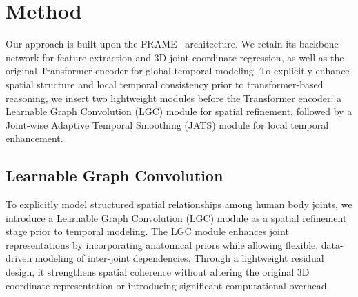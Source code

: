 \documentclass[conference]{IEEEtran}
\begin{document}
\section{Method}
Our approach is built upon the FRAME~\cite{b1} architecture. We retain its backbone network for feature extraction and 3D joint coordinate regression, as well as the original Transformer encoder for global temporal modeling. To explicitly enhance spatial structure and local temporal consistency prior to transformer-based reasoning, we insert two lightweight modules before the Transformer encoder: a Learnable Graph Convolution (LGC) module for spatial refinement, followed by a Joint-wise Adaptive Temporal Smoothing (JATS) module for local temporal enhancement.












\subsection{Learnable Graph Convolution}\label{AA}
To explicitly model structured spatial relationships among human body joints, we introduce a Learnable Graph Convolution (LGC) module as a spatial refinement stage prior to temporal modeling. The LGC module enhances joint representations by incorporating anatomical priors while allowing flexible, data-driven modeling of inter-joint dependencies. Through a lightweight residual design, it strengthens spatial coherence without altering the original 3D coordinate representation or introducing significant computational overhead.
\end{document}
